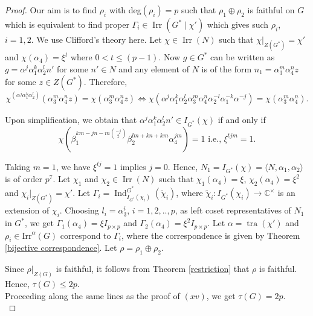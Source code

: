 \documentclass[a4paper,11pt]{amsart}
\numberwithin{equation}{section}
\numberwithin{equation}{subsection}
\newcommand{\C}{\mathbb{C}}
\begin{document}
\begin{proof}
Our aim is to find $\rho_i$ with deg$(\rho_i)=p$ such that $\rho_1 \oplus \rho_2$ is faithful on $G$ which is equivalent to find proper $\Gamma_i \in \operatorname{Irr}(G^* \mid \chi')$ which gives such $\rho_i$, $i=1,2$. We use Clifford's theory here. Let $\chi \in \operatorname{Irr}(N)$ such that
$\chi|_{Z({G}^*)} = \chi'$ and $\chi(\alpha_4) = \xi^t$ where  $0 < t \le (p-1)$. Now $g \in {G}^*$ can be written as
$g = \alpha^j \alpha_1^k \alpha_2^l n'$
for some $n' \in N$ and any element of $N$ is of the form $n_1 = \alpha_3^m \alpha_4^n z$
for some $z \in Z({G}^*)$.
Therefore,
$$\chi^{(\alpha^j \alpha_1^k \alpha_2^l)}(\alpha_3^m \alpha_4^n  z)
= \chi(\alpha_3^m \alpha_4^n z)
\iff
\chi(\alpha^j \alpha_1^k \alpha_2^l \alpha_3^m \alpha_4^n \alpha_2^{-l} \alpha_1^{-k} \alpha^{-j})
= \chi(\alpha_3^m \alpha_4^n).$$

Upon simplification, we obtain that
$\alpha^j \alpha_1^k \alpha_2^l n' \in I_{{G}^*}(\chi)$
if and only if
\[
\chi(\beta_1^{km-jn-m\binom{-j}{2}} \beta_2^{lm+kn+km} \alpha_4^{jm}) = 1 \text{ i.e., }\xi^{tjm} = 1.
\]

Taking $m=1$, we have $\xi^{tj} = 1$ implies $j=0$. Hence, $N_1= I_{{G}^*}(\chi) = \langle N, \alpha_1, \alpha_2 \rangle$ is of order $p^7$. Let $\chi_1$ and $\chi_2 \in \operatorname{Irr}(N)$ such that $\chi_1(\alpha_4)=\xi$, $\chi_2(\alpha_4)=\xi^2$ and $\chi_i|_{Z({G}^*)} = \chi'$. Let $\Gamma_i = \operatorname{Ind}^{G^*}_{I_{G^*}(\chi_i)}(\tilde{\chi}_i)$, where $\tilde{\chi}_i:I_{G^*}(\chi_i)\to \C^\times$ is an extension of $\chi_i$. Choosing $l_i=\alpha_3^i$, $i=1,2,..,p$, as left coset representatives of $N_1$ in $G^*$, we get $\Gamma_1(\alpha_4)= \xi I_{p \times p}$ and $\Gamma_2(\alpha_4)= \xi^2 I_{p \times p}$. Let $\alpha= \operatorname{tra}(\chi')$ and $\rho_i \in \mathrm{Irr}^\alpha(G)$ correspond to $\Gamma_i$, where the correspondence is given by Theorem \ref{bijective correspondence}. Let $\rho= \rho_1 \oplus \rho_2$. 

Since $\rho|_{Z(G)}$ is faithful, it follows from Theorem \ref{restriction} that $\rho$ is faithful. Hence, $\tau(G) \leq 2p$. \\
Proceeding along the same lines as the proof of $(xv)$, we get $\tau(G)= 2p$.  \\ 
\fi





\end{proof}
\end{document}
